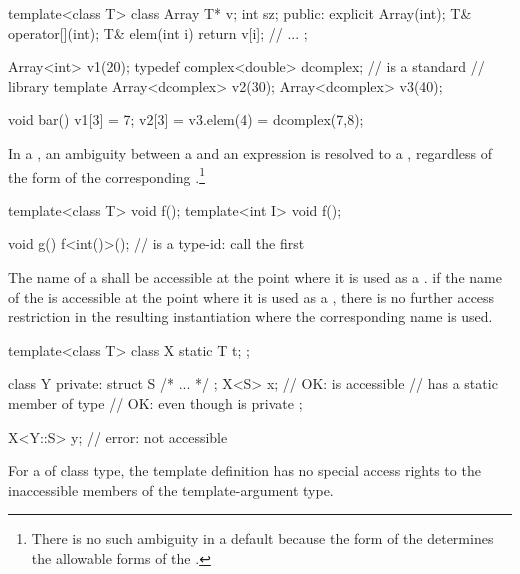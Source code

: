 \begin{codeblock}
template<class T> class Array {
	T* v;
	int sz;
public:
	explicit Array(int);
	T& operator[](int);
	T& elem(int i) { return v[i]; }
	// ...
};

Array<int> v1(20);
typedef complex<double> dcomplex;	//  is a standard
					// library template
Array<dcomplex> v2(30);
Array<dcomplex> v3(40);

void bar() {
	v1[3] = 7;
	v2[3] = v3.elem(4) = dcomplex(7,8);
}
\end{codeblock}
\exitexampleb

\pnum
In a
,
an ambiguity between a
and an expression is resolved to a
,
regardless of the form of the corresponding
.\footnote{There is no such ambiguity in a default
because the form of the
determines the allowable forms of the
.}
\enterexample

\begin{codeblock}
template<class T> void f();
template<int I> void f();

void g()
{
	f<int()>();		//  is a type-id: call the first 
}
\end{codeblock}
\exitexampleb

\pnum
The name of a
shall be accessible at the point where it is used as a
.
\enternote
if the name of the
is accessible at the point where it is used as a
,
there is no further access restriction in the resulting instantiation where the
corresponding
name is used.
\exitnote
\enterexample

\begin{codeblock}
template<class T> class X {
	static T t;
};

class Y {
private:
	struct S { /* ... */ };
	X<S> x;			// OK:  is accessible
				//  has a static member of type 
				// OK: even though  is private
};

X<Y::S> y;			// error:  not accessible
\end{codeblock}
\exitexampleb
For a
of class type, the template
definition has no special access rights to the inaccessible
members of the template-argument type.

